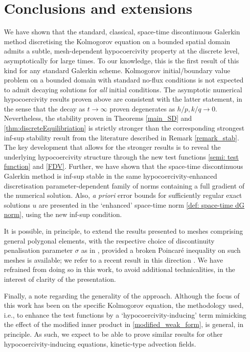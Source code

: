 \documentclass{amsart}
\theoremstyle{definition}
\theoremstyle{remark}
\numberwithin{equation}{section}
\begin{document}
\section{Conclusions and extensions} \label{sec: conclusion and extension}
We have shown that the standard, classical, space-time discontinuous Galerkin method discretising the Kolmogorov equation on a bounded spatial domain admits a subtle, mesh-dependent hypocoercivity property at the discrete level, asymptotically for large times. To our knowledge, this is the first result of this kind for any standard Galerkin scheme. Kolmogorov initial/boundary value problem on a bounded domain with standard no-flux conditions is not expected to admit decaying solutions for \emph{all} initial conditions. The asymptotic numerical hypocoercivity results proven above are consistent with the latter statement, in the sense that the decay as $t\to\infty$ proven degenerates as $h/p,k/q\to 0$. Nevertheless, the stability proven in Theorems \ref{main_SD}  and \ref{thm:discreteEquilibriation} is strictly stronger than the corresponding strongest inf-sup stability result from the literature \cite{johnson_pitkaranta, ayuso_marini,cdgh16} described in Remark \ref{remark_stab}. The key development that allows for the stronger results is to reveal the underlying hypocoercivity structure through the new test functions \eqref{semi: test function} and \eqref{FDV}. Further, we have shown that the space-time discontinuous Galerkin method is inf-sup stable in the same hypocoercivity-enhanced discretisation parameter-dependent family of norms containing a full gradient of the numerical solution. Also, \emph{a priori} error bounds for sufficiently regular exact solutions $u$ are presented in the `enhanced' space-time norm \eqref{def: space-time dG norm}, using the new inf-sup condition.


It is possible, in principle, to extend the results presented to meshes comprising general polygonal elements, with the respective choice of discontinuity penalisation parameter $\sigma$ as in \cite{cdgh16,cdgh_book}, provided a  broken Poincar\'e inequality on such meshes is available; we refer to a recent result in this direction \cite{botti2025sobolev}. We have refrained from doing so in this work, to avoid additional technicalities, in the interest of clarity of the presentation.


Finally, a note regarding the generality of the approach. Although the focus of this work has been on the specific Kolmogorov equation, the methodology used, i.e., to enhance the test functions by a `hypocoercivity-inducing' term mimicking the effect of the modified inner product in \eqref{modified_weak_form}, is general, in principle. As such, we expect to be able to prove similar results for other hypocoercivity-inducing equations, kinetic-type advection fields.
\end{document}
